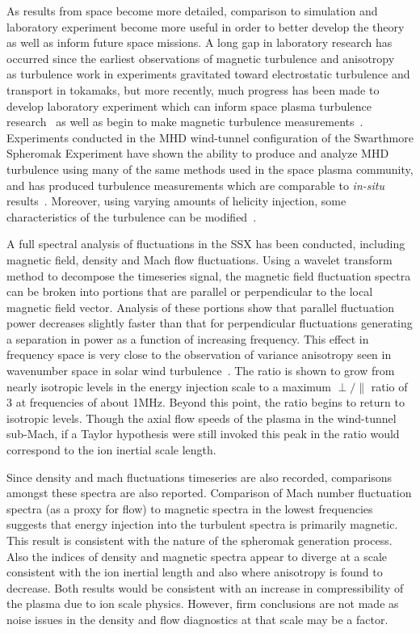 \documentclass[aip,prl,amsmath,amssymb,reprint,superscriptaddress]{revtex4-1} %
\begin{document}
As results from space become more detailed, comparison to simulation and laboratory experiment become more useful in order to better develop the theory as well as inform future space missions. A long gap in laboratory research has occurred since the earliest observations of magnetic turbulence and anisotropy~\cite{robinson71} as turbulence work in experiments gravitated toward electrostatic turbulence and transport in tokamaks, but more recently, much progress has been made to develop laboratory experiment which can inform space plasma turbulence research~\cite{howes12a} as well as begin to make magnetic turbulence measurements~\cite{ren11}. Experiments conducted in the MHD wind-tunnel configuration of the Swarthmore Spheromak Experiment have shown the ability to produce and analyze MHD turbulence using many of the same methods used in the space plasma community, and has produced turbulence measurements which are comparable to \textit{in-situ} results~\cite{schaffner14a}. Moreover, using varying amounts of helicity injection, some characteristics of the turbulence can be modified~\cite{schaffner14b}.

A full spectral analysis of fluctuations in the SSX has been conducted, including magnetic field, density and Mach flow fluctuations. Using a wavelet transform method to decompose the timeseries signal, the magnetic field fluctuation spectra can be broken into portions that are parallel or perpendicular to the local magnetic field vector. Analysis of these portions show that parallel fluctuation power decreases slightly faster than that for perpendicular fluctuations generating a separation in power as a function of increasing frequency. This effect in frequency space is very close to the observation of variance anisotropy seen in wavenumber space in solar wind turbulence~\cite{kiyani13}. The ratio is shown to grow from nearly isotropic levels in the energy injection scale to a maximum $\perp/\parallel$ ratio of 3 at frequencies of about 1MHz. Beyond this point, the ratio begins to return to isotropic levels. Though the axial flow speeds of the plasma in the wind-tunnel sub-Mach, if a Taylor hypothesis were still invoked this peak in the ratio would correspond to the ion inertial scale length. 

Since density and mach fluctuations timeseries are also recorded, comparisons amongst these spectra are also reported. Comparison of Mach number fluctuation spectra (as a proxy for flow) to magnetic spectra in the lowest frequencies suggests that energy injection into the turbulent spectra is primarily magnetic. This result is consistent with the nature of the spheromak generation process. Also the indices of density and magnetic spectra appear to diverge at a scale consistent with the ion inertial length and also where anisotropy is found to decrease. Both results would be consistent with an increase in compressibility of the plasma due to ion scale physics. However, firm conclusions are not made as noise issues in the density and flow diagnostics at that scale may be a factor.
\end{document}
